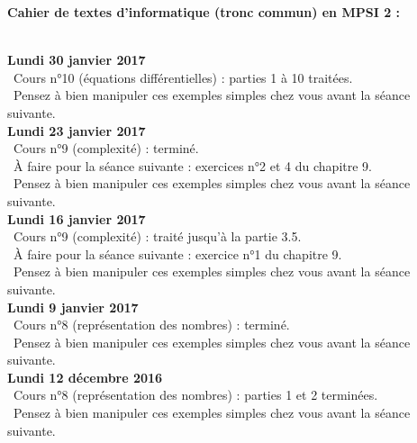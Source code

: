 \documentclass[12pt,a4paper]{article}
\begin{document}
\begin{center}
\Large\bf Cahier de textes d'informatique (tronc commun) en MPSI 2 :
\end{center}
\vspace{1cm}
\vspace{.4cm}\\

\noindent\textbf{Lundi 30 janvier 2017}\\
\bu\ Cours n°10 (équations différentielles) : parties 1 à 10 traitées. \\
\bu\ Pensez à bien manipuler ces exemples simples chez vous avant la séance suivante. \vspace{.4cm}\\

\noindent\textbf{Lundi 23 janvier 2017}\\
\bu\ Cours n°9 (complexité) : terminé. \\
\bu\ À faire pour la séance suivante : exercices n°2 et 4 du chapitre 9.\\
\bu\ Pensez à bien manipuler ces exemples simples chez vous avant la séance suivante. \vspace{.4cm}\\

\noindent\textbf{Lundi 16 janvier 2017}\\
\bu\ Cours n°9 (complexité) : traité jusqu'à la partie 3.5. \\
\bu\ À faire pour la séance suivante : exercice n°1 du chapitre 9.\\
\bu\ Pensez à bien manipuler ces exemples simples chez vous avant la séance suivante. \vspace{.4cm}\\

\noindent\textbf{Lundi 9 janvier 2017}\\
\bu\ Cours n°8 (représentation des nombres) : terminé. \\
\bu\ Pensez à bien manipuler ces exemples simples chez vous avant la séance suivante. \vspace{.4cm}\\

\noindent\textbf{Lundi 12 décembre 2016 }\\
\bu\ Cours n°8 (représentation des nombres) : parties 1 et 2 terminées. \\
\bu\ Pensez à bien manipuler ces exemples simples chez vous avant la séance suivante. \vspace{.4cm}\\
\end{document}
